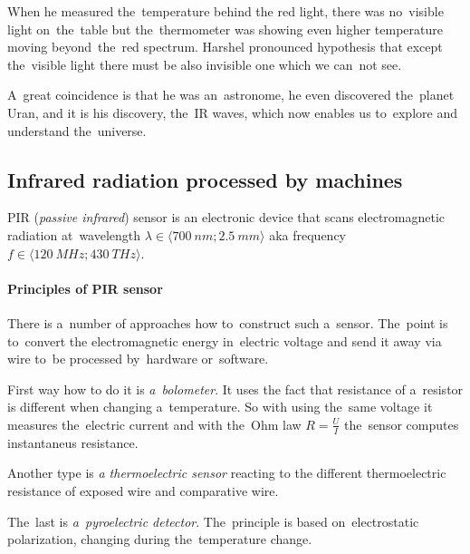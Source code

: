 When he measured the~temperature behind the red light, there was no~visible light on~the~table but
the~thermometer was showing even higher temperature moving beyond~the~red spectrum. Harshel
pronounced hypothesis that except the~visible light there must be also invisible one which we can~not
see. \cite{HerschelLife}


A~great coincidence is that he was an~astronome, he even discovered the~planet Uran, and it is his discovery,
the~IR waves, which now enables us to~explore and understand the~universe. \cite{NasaIrVideo}



\subsection*{Infrared radiation processed by machines}
\label{IRsensing}
PIR ({\it passive infrared}) sensor is an electronic device that scans electromagnetic
radiation at~wavelength $\lambda\in \langle 700~nm;2.5~mm \rangle$ aka frequency $f\in \langle 120~MHz;430~THz \rangle$. \cite{an2105}

\paragraph{Principles of PIR sensor}
There is a~number of approaches how to~construct such a~sensor. The~point is to~convert the electromagnetic
energy in~electric voltage and send it away via wire to~be processed by~hardware or~software.

First way how to do it is {\it a~bolometer}. It uses the fact that resistance of a~resistor is different
when changing a~temperature. So with using the~same voltage it measures the~electric current and
with the~Ohm law $R = \frac{U}{I}$ the~sensor computes instantaneus resistance.

Another type is {\it a thermoelectric sensor} reacting to the different thermoelectric resistance of
exposed wire and comparative wire.

The~last is {\it a~pyroelectric detector}. The~principle is based on~electrostatic polarization,
changing during the~temperature change. \cite{DetectorsBook}

